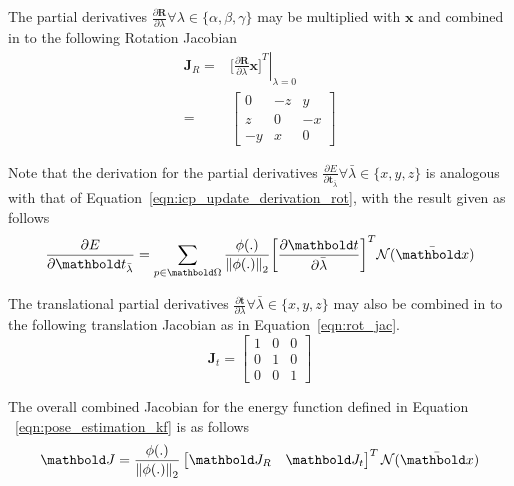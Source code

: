 The partial derivatives
\( \frac{\partial \bm{R}}{\partial \lambda} \forall \lambda \in \{\alpha, \beta, \gamma \} \) 
may be multiplied with \(\bm{x}\) and combined in to the following Rotation Jacobian
\begin{align}
  \label{eqn:rot_jac}
  \bm{J}_{R} ={}& \left. {\bigg[
    \frac{\partial \bm{R}}{\partial \lambda} \bm{x}
    \bigg]}^{T} \right\vert_{\lambda = 0} \\
  ={}&
  \begin{bmatrix}
    0 & -z & y \\
    z & 0 & -x \\
    -y & x & 0
  \end{bmatrix}
\end{align}

Note that the derivation for the partial derivatives
\(\frac{\partial E}{\partial \bm{t}_{\bar{\lambda}}} \forall \bar{\lambda} \in \{x, y, z\} \) 
is analogous with that of Equation~\ref{eqn:icp_update_derivation_rot}, with the result given as 
follows
\begin{equation}
  \label{eqn:icp_update_derivation_trans}
  \frac{\partial E}{\partial \bm{t}_{\bar{\lambda}}} =
  \sum_{p \in \bm{\Omega}}
  \frac{\phi(.)}{\norm{\phi(.)}}
  {\bigg[ \frac{\partial \bm{t}}{\partial \bar{\lambda}}\bigg]}^{T}
  \mathcal{N}(\bar{\bm{x}})
\end{equation}

The translational partial derivatives
\( \frac{\partial \bm{t}}{\partial \lambda} \forall \bar{\lambda} \in \{x, y, z\} \) may also 
be combined in to the following translation Jacobian as in Equation~\ref{eqn:rot_jac}.
\begin{equation}
  \label{eqn:trans_jac}
  \bm{J}_{t} =
  \begin{bmatrix}
    1 & 0 & 0 \\
    0 & 1 & 0 \\
    0 & 0 & 1
  \end{bmatrix}
\end{equation}

The overall combined Jacobian for the energy function defined in Equation
~\ref{eqn:pose_estimation_kf} is as follows
\begin{equation}
  \label{eqn:pose_jacobian}
  \bm{J} =
  \frac{\phi(.)}{\norm{\phi(.)}}
  \begin{bmatrix}
    \bm{J}_{R} & \bm{J}_{t}
  \end{bmatrix}^{T}
  \mathcal{N}(\bar{\bm{x}})
\end{equation}

